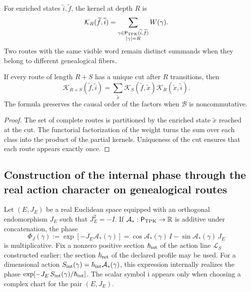 For enriched states \(\widetilde i,\widetilde f\), the kernel at
depth \(R\) is
\begin{equation}
 \mathcal K_R(\widetilde f,\widetilde i)
 =\sum_{\substack{
   \gamma\in\mathsf P_{\rm TPK}(\widetilde i,\widetilde f)\\
   |\gamma|=R}}
 W(\gamma).
 \label{x_reciprocidad:eq:kernel-genealogico-finito-rev2}
\end{equation}
Two routes with the same visible word remain distinct summands
when they belong to different genealogical fibers.

\begin{proposition}
\label{x_reciprocidad:prop:composicion-kernel-enriquecido-rev2}
If every route of length \(R+S\) has a unique cut after \(R\)
transitions, then
\[
 \mathcal K_{R+S}(\widetilde f,\widetilde i)
 =\sum_{\widetilde x}
 \mathcal K_S(\widetilde f,\widetilde x)
 \mathcal K_R(\widetilde x,\widetilde i).
\]
The formula preserves the causal order of the factors when \(\mathcal B\) is
noncommutative.
\end{proposition}

\begin{proof}
The set of complete routes is partitioned by the enriched state
\(\widetilde x\) reached at the cut. The functorial factorization of the weight
turns the sum over each class into the product of the partial kernels.
Uniqueness of the cut ensures that each route appears exactly once.
\end{proof}

\subsection{Construction of the internal phase through the real action character on genealogical routes}

Let \((E,J_E)\) be a real Euclidean space equipped with an orthogonal
endomorphism \(J_E\) such that \(J_E^2=-I\). If
\(\mathcal A_*:\mathsf P_{\rm TPK}\to\mathbb R\) is additive under
concatenation, the phase
\begin{equation}
 \Phi_J(\gamma)
 :=\exp[-J_E\mathcal A_*(\gamma)]
 =\cos\mathcal A_*(\gamma)\,I
  -\sin\mathcal A_*(\gamma)\,J_E
 \label{x_reciprocidad:eq:fase-interna-caminos-rev2}
\end{equation}
is multiplicative. Fix a nonzero positive section
\(\hbar_{\rm int}\) of the action line \(\mathcal L_S\)
constructed earlier; the section
\(\hbar_{\rm ret}\) of the declared profile may be used.
For a dimensional action
\(S_{\rm int}(\gamma)=\hbar_{\rm int}\mathcal A_*(\gamma)\), this
expression internally realizes the phase
\(\exp[-J_E\,S_{\rm int}(\gamma)/\hbar_{\rm int}]\). The scalar symbol
\(\mathrm i\) appears only when choosing a complex chart for the pair
\((E,J_E)\).

